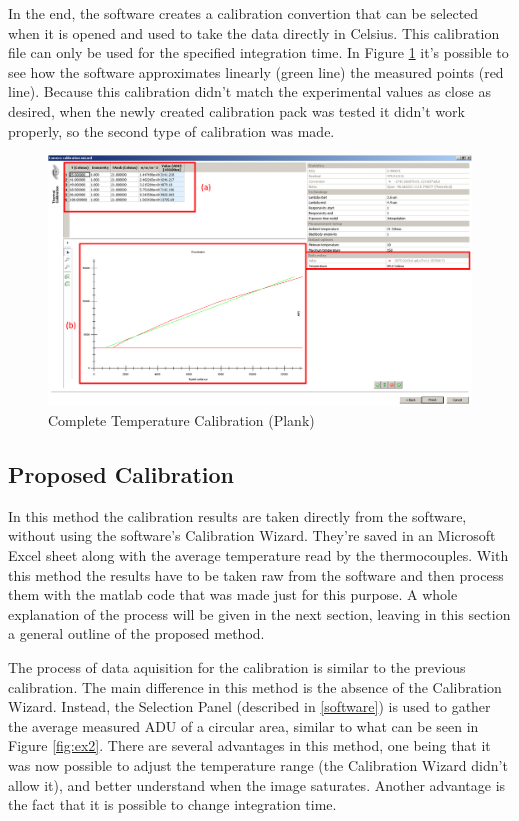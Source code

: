 \par In the end, the software creates a calibration convertion that can be selected when it is opened and used to take the data directly in Celsius. This calibration file can only be used for the specified integration time. In Figure \ref{fig:calib} it's possible to see how the software approximates linearly (green line) the measured points (red line). Because this calibration didn't match the experimental values as close as desired, when the newly created calibration pack was tested it didn't work properly, so the second type of calibration was made. \\

\begin{figure}[h]
\centering
\includegraphics[width=0.7\linewidth]{Figures/4.Chapter/calibracao.png}
\caption{Complete Temperature Calibration (Plank)}
\label{fig:calib}
\end{figure}

\subsection{Proposed Calibration}

\par In this method the calibration results are taken directly from the software, without using the software's Calibration Wizard. They're saved in an Microsoft Excel sheet along with the average temperature read by the thermocouples. With this method the results have to be taken raw from the software and then process them with the matlab code that was made just for this purpose. A whole explanation of the process will be given in the next section, leaving in this section a general outline of the proposed method.\\

\par The process of data aquisition for the calibration is similar to the previous calibration. The main difference in this method is the absence of the Calibration Wizard. Instead, the Selection Panel (described in \ref{software}) is used to gather the average measured ADU of a circular area, similar to what can be seen in Figure \ref{fig:ex2}. There are several advantages in this method, one being that it was now possible to adjust the temperature range (the Calibration Wizard didn't allow it), and better understand when the image saturates. Another advantage is the fact that it is possible to change integration time. \\

